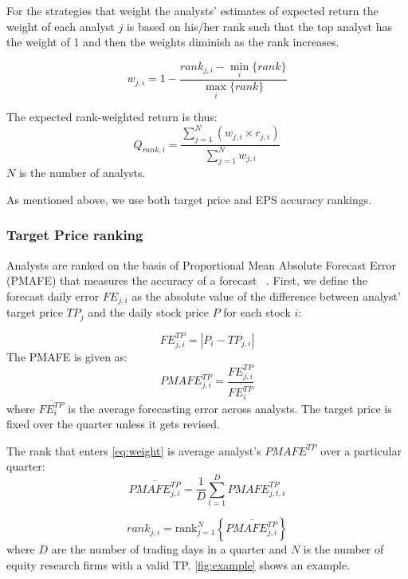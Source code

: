 \documentclass[a4paper,twoside,12pt,openright,notitlepage]{report}\usepackage[]{graphicx}\usepackage[]{color}
\begin{document}
For the strategies that weight the analysts' estimates of expected return the weight of each analyst $j$ is based on his/her rank such that the top analyst has the weight of 1 and then the weights diminish as the rank increases.


\begin{equation}
\label{eq:weight}
w_{j,i}=1-\frac{rank_{j,i}-\min_i{ \{rank \} }}{\max_i{\{rank \}}}
\end{equation}

The expected rank-weighted return is thus:
\begin{equation}
\label{rankq}
Q_{rank,i}=\frac{\sum_{j=1}^{N} (w_{j,i} \times r_{j,i})}{\sum_{j=1}^{N} w_{j,i}}
\end{equation}
$N$ is the number of analysts.

As mentioned above, we use both target price and EPS accuracy rankings.

\subsubsection{Target Price ranking}
Analysts are ranked on the basis of Proportional Mean Absolute Forecast Error (PMAFE) that measures the accuracy of a forecast ~\citep{clement1999,brown2001,ertimur2007}. First,  we define the forecast daily error  $FE_{j,i}$ as the absolute value of the difference between analyst' target price $TP_{j}$ and the daily stock price $P$ for each stock $i$:

\begin{equation}
\label{dfe}
FE_{j,i}^{TP}=|{P_{i}-TP_{j,i}}|
\end{equation}
The PMAFE is given as:
\begin{equation}
\label{tp:pmafe}
PMAFE_{j,i}^{TP}=\frac{FE_{j,i}^{TP}}{\overline{FE_{i}^{TP}}}
\end{equation}
where $\overline{{FE}_{i}^{TP}}$ is the average forecasting error across analysts. The target price is fixed over the quarter unless it gets revised.

The rank  that enters \ref{eq:weight} is average analyst's $PMAFE^{TP}$ over a particular quarter:
\begin{equation}
\overline{PMAFE_{j,i}^{TP}}=\frac{1}{D} \sum_{t=1}^{D} PMAFE_{j,t,i}^{TP}
\end{equation}

\begin{equation}
\label{tp:rank}
rank_{j,i}=\mathrm{rank}_{j=1}^{N} \left\{ \overline{PMAFE_{j,i}^{TP}} \right\}
\end{equation}
where $D$ are the number of trading days in a quarter and $N$ is the number of equity research firms with a valid TP. \ref{fig:example} shows an example.
\end{document}
